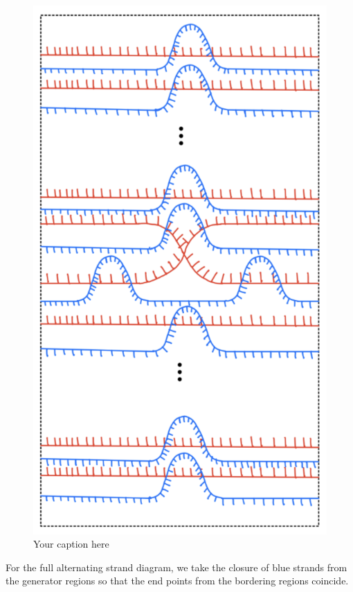 \begin{figure}[H] 
    \centering
    \includegraphics[scale = 0.95]{diagrams/natural_alternating_diagrams/9.png}
    \caption{Your caption here}
    \label{fig:your-label}
\end{figure}

For the full alternating strand diagram, we take the closure of blue strands from the generator regions so that the end points from the bordering regions coincide.

